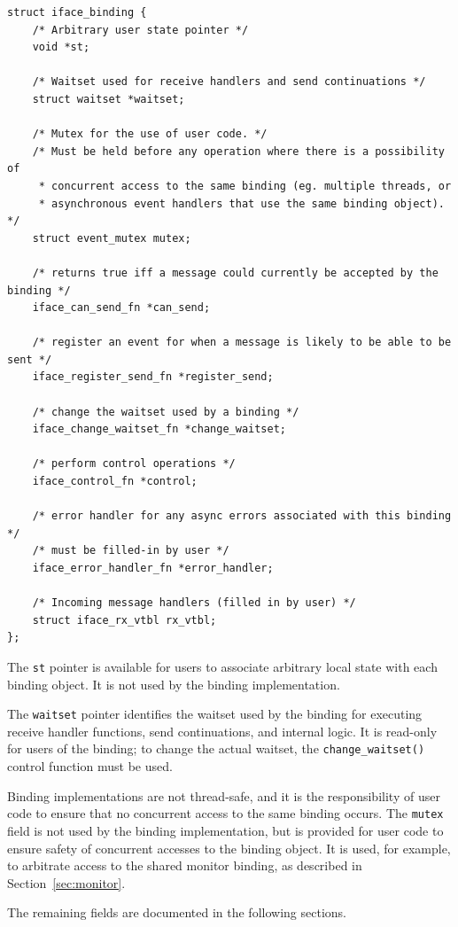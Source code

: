 \documentclass[a4paper,twoside]{report} %
\begin{document}
\begin{lstlisting}
struct iface_binding {
    /* Arbitrary user state pointer */
    void *st;

    /* Waitset used for receive handlers and send continuations */
    struct waitset *waitset;

    /* Mutex for the use of user code. */
    /* Must be held before any operation where there is a possibility of
     * concurrent access to the same binding (eg. multiple threads, or
     * asynchronous event handlers that use the same binding object). */
    struct event_mutex mutex;

    /* returns true iff a message could currently be accepted by the binding */
    iface_can_send_fn *can_send;

    /* register an event for when a message is likely to be able to be sent */
    iface_register_send_fn *register_send;

    /* change the waitset used by a binding */
    iface_change_waitset_fn *change_waitset;

    /* perform control operations */
    iface_control_fn *control;

    /* error handler for any async errors associated with this binding */
    /* must be filled-in by user */
    iface_error_handler_fn *error_handler;

    /* Incoming message handlers (filled in by user) */
    struct iface_rx_vtbl rx_vtbl;
};
\end{lstlisting}

The \lstinline+st+ pointer is available for users to associate arbitrary local
state with each binding object. It is not used by the binding implementation.

The \lstinline+waitset+ pointer identifies the waitset used by the binding for
executing receive handler functions, send continuations, and internal logic. It
is read-only for users of the binding; to change the actual waitset, the
\lstinline+change_waitset()+ control function must be used.

Binding implementations are not thread-safe, and it is the responsibility of
user code to ensure that no concurrent access to the same binding occurs.
The \lstinline+mutex+ field is not used by the binding implementation, but is
provided for user code to ensure safety of concurrent accesses to the binding
object. It is used, for example, to arbitrate access to the shared monitor
binding, as described in Section~\ref{sec:monitor}.

The remaining fields are documented in the following sections.
\end{document}
